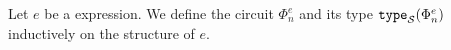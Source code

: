 %
%
%
%

\medskip
Let $e$ be a \langfor expression. We define the circuit $\Phi_n^e$ and its type $\texttt{type}_{\mathcal{S}}(\Phi_n^e)$ inductively on the structure of $e$.

